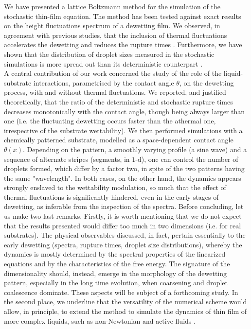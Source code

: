 We have presented a lattice Boltzmann method for the simulation of the stochastic thin-film equation. 
The method has been tested against exact results on the height fluctuations spectrum of a dewetting film.  
We observed, in agreement with previous studies, that the inclusion of thermal fluctuations accelerates the dewetting and reduces the rupture times \cite{grunThinFilmFlowInfluenced2006}.
Furthermore, we have shown that the distribution of droplet sizes measured in the stochastic simulations is more spread out than its deterministic counterpart \cite{nesicFullyNonlinearDynamics2015}. \\
A central contribution of our work concerned the study of the role of the liquid-substrate interactions, parametrised by the contact angle $\theta$, on the dewetting process, with and without thermal fluctuations.
We reported, and justified theoretically, that the ratio of the deterministic and stochastic rupture times decreases monotonically with the contact angle, though being always larger than one (i.e. the fluctuating dewetting occurs faster than the athermal one, irrespective of the substrate wettability).  
We then performed simulations with a chemically patterned substrate, modelled as a space-dependent contact angle $\theta(x)$. 
Depending on the pattern, a smoothly varying profile (a sine wave) and a sequence of alternate stripes (segments, in $1$-d), one can control the number of droplets formed, which differ by a factor two, in spite of the two patterns having the same "wavelength".
In both cases, on the other hand, the dynamics appears strongly enslaved to the wettability modulation, so much that the effect of thermal fluctuations is significantly hindered, even in the early stages of dewetting, as inferable from the inspection of the spectra.
Before concluding, let us make two last remarks. Firstly, it is worth mentioning that we do not expect that the results presented would differ too much in two dimensions (i.e. for real substrates).
The physical observables discussed, in fact, pertain essentially to the early dewetting (spectra, rupture times, droplet size distributions), whereby the dynamics is mostly determined by the spectral properties of the linearized equations and by the characteristics of the free energy.
The signature of the dimensionality should, instead, emerge in the morphology of the dewetting pattern, especially in the long time evolution, when coarsening and droplet coalescence dominate. These aspects will be subject of a forthcoming study. 
In the second place, we underline that the versatility of the numerical scheme would allow, in principle, to extend the method to simulate the dynamics of thin film of more complex liquids, such as non-Newtonian and active fluids \cite{eggersNonlinearDynamicsBreakup1997,carenzaLatticeBoltzmannMethods2019}.

